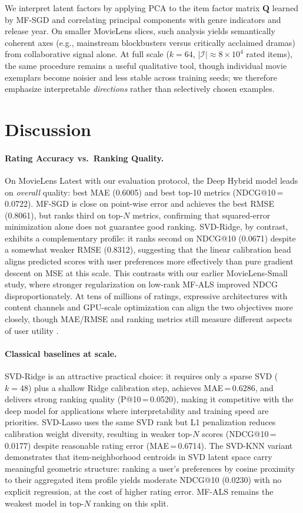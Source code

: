 \documentclass[11pt]{article}
\begin{document}
We interpret latent factors by applying PCA to the item factor matrix $\mathbf{Q}$ learned by MF-SGD and correlating principal components with genre indicators and release year.
On smaller MovieLens slices, such analysis yields semantically coherent axes (e.g., mainstream blockbusters versus critically acclaimed dramas) from collaborative signal alone.
At full scale ($k{=}64$, $|\mathcal{I}|{\approx}8{\times}10^4$ rated items), the same procedure remains a useful qualitative tool, though individual movie exemplars become noisier and less stable across training seeds; we therefore emphasize interpretable \emph{directions} rather than selectively chosen examples.


\section{Discussion}

\paragraph{Rating Accuracy vs.\ Ranking Quality.}
On MovieLens Latest with our evaluation protocol, the Deep Hybrid model leads on \emph{overall} quality: best MAE (0.6005) and best top-10 metrics (NDCG@10\,=\,0.0722).
MF-SGD is close on point-wise error and achieves the best RMSE (0.8061), but ranks third on top-$N$ metrics, confirming that squared-error minimization alone does not guarantee good ranking.
SVD-Ridge, by contrast, exhibits a complementary profile: it ranks second on NDCG@10 (0.0671) despite a somewhat weaker RMSE (0.8312), suggesting that the linear calibration head aligns predicted scores with user preferences more effectively than pure gradient descent on MSE at this scale.
This contrasts with our earlier MovieLens-Small study, where stronger regularization on low-rank MF-ALS improved NDCG disproportionately.
At tens of millions of ratings, expressive architectures with content channels and GPU-scale optimization can align the two objectives more closely, though MAE/RMSE and ranking metrics still measure different aspects of user utility \cite{rendle2009bpr}.

\paragraph{Classical baselines at scale.}
SVD-Ridge is an attractive practical choice: it requires only a sparse SVD ($k{=}48$) plus a shallow Ridge calibration step, achieves MAE\,=\,0.6286, and delivers strong ranking quality (P@10\,=\,0.0520), making it competitive with the deep model for applications where interpretability and training speed are priorities.
SVD-Lasso uses the same SVD rank but L1 penalization reduces calibration weight diversity, resulting in weaker top-$N$ scores (NDCG@10\,=\,0.0177) despite reasonable rating error (MAE\,=\,0.6714).
The SVD-KNN variant demonstrates that item-neighborhood centroids in SVD latent space carry meaningful geometric structure: ranking a user's preferences by cosine proximity to their aggregated item profile yields moderate NDCG@10 (0.0230) with no explicit regression, at the cost of higher rating error.
MF-ALS remains the weakest model in top-$N$ ranking on this split.
\end{document}
